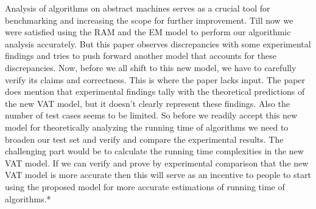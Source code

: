 Analysis of algorithms on abstract machines serves as a crucial tool for benchmarking and increasing the scope for further improvement. Till now we were satisfied using the RAM and the EM model to perform our algorithmic analysis accurately. But this paper observes discrepancies with some experimental findings and tries to push forward another model that accounts for these discrepancies. Now, before we all shift to this new model, we have to carefully verify its claims and correctness. This is where the paper lacks input. The paper does mention that experimental findings tally with the theoretical predictions of the new VAT model, but it doesn’t clearly represent these findings. Also the number of test cases seems to be limited. So before we readily accept this new model for theoretically analyzing the running time of algorithms we need to broaden our test set and verify and compare the experimental results. The challenging part would be to calculate the running time complexities in the new VAT model. If we can verify and prove by experimental comparison that the new VAT model is more accurate then this will serve as an incentive to people to start using the proposed model for more accurate estimations of running time of algorithms.*
